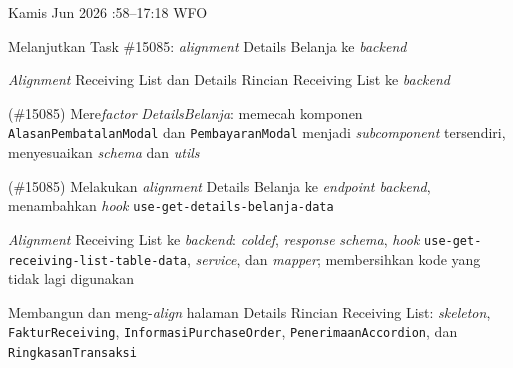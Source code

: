 \begin{logtable}
    {
        Kamis  Jun 2026 :58--17:18 \linebreak %
        WFO
    }{
        \begin{loglist}
            \item Melanjutkan Task \#15085: \textit{alignment} Details Belanja ke
            \textit{backend}
            \item \textit{Alignment} Receiving List dan Details Rincian Receiving List ke
            \textit{backend}
        \end{loglist}
    }{
        \begin{logwork}
            \item (\#15085) Mere\textit{factor} \textit{DetailsBelanja}: memecah komponen \texttt{AlasanPembatalanModal} dan \texttt{PembayaranModal} menjadi \textit{subcomponent} tersendiri, menyesuaikan \textit{schema} dan \textit{utils}
            \item (\#15085) Melakukan \textit{alignment} Details Belanja ke \textit{endpoint backend}, menambahkan \textit{hook} \texttt{use-get-details-belanja-data}
            \item \textit{Alignment} Receiving List ke \textit{backend}: \textit{coldef}, \textit{response} \textit{schema}, \textit{hook} \texttt{use-get-receiving-list-table-data}, \textit{service}, dan \textit{mapper}; membersihkan kode yang tidak lagi digunakan
            \item Membangun dan meng-\textit{align} halaman Details Rincian Receiving List:
            \textit{skeleton}, \texttt{FakturReceiving}, \texttt{InformasiPurchaseOrder},
            \texttt{PenerimaanAccordion}, dan \texttt{RingkasanTransaksi}
        \end{logwork}
    }


\end{logtable}
